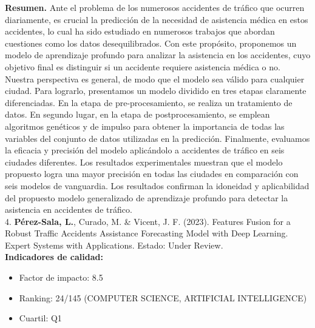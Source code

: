 \documentclass{uathesis-es}
\begin{document}
{		\textbf{Resumen.} Ante el problema de los numerosos accidentes de tráfico que ocurren diariamente, es crucial  la predicción de la necesidad de asistencia médica en estos accidentes, lo cual ha sido estudiado en numerosos trabajos que abordan cuestiones como los datos desequilibrados. Con este propósito, proponemos un modelo de aprendizaje profundo para analizar la asistencia en los accidentes, cuyo objetivo final es distinguir si un accidente requiere asistencia médica o no. Nuestra perspectiva es general, de modo que el modelo sea válido para cualquier ciudad. Para lograrlo, presentamos un modelo dividido en tres etapas claramente diferenciadas. En la etapa de pre-procesamiento, se realiza un tratamiento de datos. En segundo lugar, en la etapa de postprocesamiento, se emplean algoritmos genéticos y de impulso para obtener la importancia de todas las variables del conjunto de datos utilizadas en la predicción. Finalmente, evaluamos la eficacia y precisión del modelo aplicándolo a accidentes de tráfico en seis ciudades diferentes. Los resultados experimentales muestran que el modelo propuesto logra una mayor precisión en todas las ciudades en comparación con seis modelos de vanguardia. Los resultados confirman la idoneidad y aplicabilidad del propuesto modelo generalizado de aprendizaje profundo para detectar la asistencia en accidentes de tráfico. \\
		
		
		4. \textbf{Pérez-Sala, L.}, Curado, M. \& Vicent, J. F. (2023). Features Fusion for a Robust Traffic Accidents Assistance Forecasting Model with Deep Learning. Expert Systems with Applications. Estado: Under Review.\\
		
		\textbf{Indicadores de calidad:} 
		\begin{itemize}
			\item Factor de impacto: 8.5
			\item Ranking: 24/145 (COMPUTER SCIENCE, ARTIFICIAL INTELLIGENCE)
			\item Cuartil: Q1
		\end{itemize}
		
}
\end{document}
